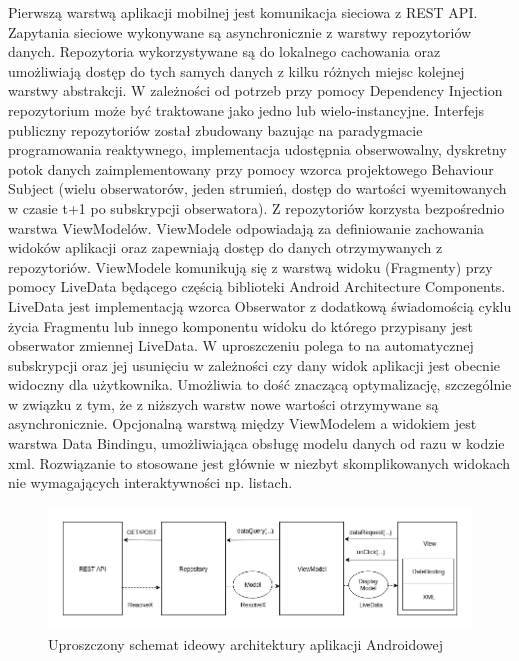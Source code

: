 \documentclass[polish, 11pt]{article}
\begin{document}
    Pierwszą warstwą aplikacji mobilnej jest komunikacja sieciowa z REST API. Zapytania sieciowe wykonywane są asynchronicznie z warstwy repozytoriów danych. Repozytoria wykorzystywane są do lokalnego cachowania oraz umożliwiają dostęp do tych samych danych z kilku różnych miejsc kolejnej warstwy abstrakcji. W zależności od potrzeb przy pomocy Dependency Injection repozytorium może być traktowane jako jedno lub wielo-instancyjne. Interfejs publiczny repozytoriów został zbudowany bazując na paradygmacie programowania reaktywnego, implementacja udostępnia obserwowalny, dyskretny potok danych zaimplementowany przy pomocy wzorca projektowego Behaviour Subject (wielu obserwatorów, jeden strumień, dostęp do wartości wyemitowanych w czasie t+1 po subskrypcji obserwatora). Z repozytoriów korzysta bezpośrednio warstwa ViewModelów. ViewModele odpowiadają za definiowanie zachowania widoków aplikacji oraz zapewniają dostęp do danych otrzymywanych z repozytoriów.
    ViewModele komunikują się z warstwą widoku (Fragmenty) przy pomocy LiveData będącego częścią biblioteki Android Architecture Components. LiveData jest implementacją wzorca Obserwator z dodatkową świadomością cyklu życia Fragmentu lub innego komponentu widoku do którego przypisany jest obserwator zmiennej LiveData. W uproszczeniu polega to na automatycznej subskrypcji oraz jej usunięciu w zależności czy dany widok aplikacji jest obecnie widoczny dla użytkownika. Umożliwia to dość znaczącą optymalizację, szczególnie w związku z tym, że z niższych warstw nowe wartości otrzymywane są asynchronicznie. Opcjonalną warstwą między ViewModelem a widokiem jest warstwa Data Bindingu, umożliwiająca obsługę modelu danych od razu w kodzie xml. Rozwiązanie to stosowane jest głównie w niezbyt skomplikowanych widokach nie wymagających interaktywności np. listach.
    
    \begin{figure}[H]
    	\centering
    	\includegraphics[width=\textwidth]{figures/androidArch.png}
    	\caption{Uproszczony schemat ideowy architektury aplikacji Androidowej}
    \end{figure}     
        
\end{document}
